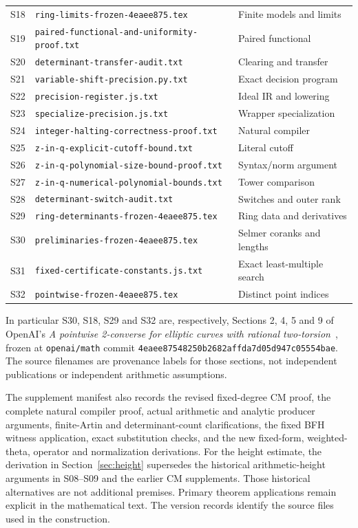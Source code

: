 \begin{longtable}{p{}p{}p{}}
S18 & \texttt{ring-limits-frozen-4eaee875.tex} & Finite models and limits\\
S19 & \texttt{paired-functional-and-uniformity-proof.txt} & Paired functional\\
S20 & \texttt{determinant-transfer-audit.txt} & Clearing and transfer\\
S21 & \texttt{variable-shift-precision.py.txt} & Exact decision program\\
S22 & \texttt{precision-register.js.txt} & Ideal IR and lowering\\
S23 & \texttt{specialize-precision.js.txt} & Wrapper specialization\\
S24 & \texttt{integer-halting-correctness-proof.txt} & Natural compiler\\
S25 & \texttt{z-in-q-explicit-cutoff-bound.txt} & Literal cutoff\\
S26 & \texttt{z-in-q-polynomial-size-bound-proof.txt} & Syntax/norm argument\\
S27 & \texttt{z-in-q-numerical-polynomial-bounds.txt} & Tower comparison\\
S28 & \texttt{determinant-switch-audit.txt} & Switches and outer rank\\
S29 & \texttt{ring-determinants-frozen-4eaee875.tex} & Ring data and derivatives\\
S30 & \texttt{preliminaries-frozen-4eaee875.tex} & Selmer coranks and lengths\\
S31 & \texttt{fixed-certificate-constants.js.txt} & Exact least-multiple search\\
S32 & \texttt{pointwise-frozen-4eaee875.tex} & Distinct point indices\\
\bottomrule
\end{longtable}
In particular S30, S18, S29 and S32 are, respectively, Sections
2, 4, 5 and 9 of OpenAI's \emph{A pointwise 2-converse for elliptic
curves with rational two-torsion}~\cite{openaipointwise}, frozen at
\texttt{openai/math} commit
\nolinkurl{4eaee87548250b2682affda7d05d947c05554bae}.
The source filenames are provenance labels for those sections, not
independent publications or independent arithmetic assumptions.

The supplement manifest also records the revised fixed-degree CM proof,
the complete natural compiler proof, actual arithmetic and analytic
producer arguments, finite-Artin and determinant-count clarifications,
the fixed BFH witness application, exact substitution checks, and the
new fixed-form, weighted-theta, operator and normalization derivations.
For the height estimate, the derivation in Section~\ref{sec:height}
supersedes the historical arithmetic-height arguments in S08--S09 and
the earlier CM supplements. Those historical alternatives are not
additional premises. Primary theorem applications remain explicit in
the mathematical text.
The version records identify the source files used in the construction.

